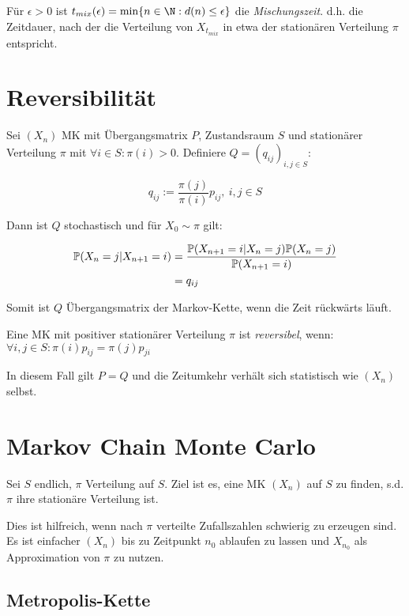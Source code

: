 Für $\epsilon > 0$ ist $t_{mix}(\epsilon) = \min\{ n \in \N : d(n) \leq \epsilon \}$ die \emph{Mischungszeit}. d.h. die Zeitdauer, nach der die Verteilung von $X_{t_{mix}}$ in etwa der stationären Verteilung $\pi$ entspricht.

\section*{Reversibilität}

Sei $(X_n)$ MK mit Übergangsmatrix $P$, Zustandsraum $S$ und stationärer Verteilung $\pi$ mit $\forall i \in S : \pi(i) > 0$. Definiere $Q = (q_{ij})_{i,j \in S}$:

\vspace*{-2mm}
\[ q_{ij} := \frac{\pi(j)}{\pi(i)} p_{ij}, \ i,j \in S \]

Dann ist $Q$ stochastisch und für $X_0 \sim \pi$ gilt:

\vspace*{-4mm}
\begin{align*}
\P(X_n = j | X_{n+1} = i) &= \frac{\P(X_{n+1} = i | X_n = j) \P(X_n = j)}{\P(X_{n+1} = i)} \\
&= q_{ij}
\end{align*}

Somit ist $Q$ Übergangsmatrix der Markov-Kette, wenn die Zeit rückwärts läuft.

\vspace*{1mm}

Eine MK mit positiver stationärer Verteilung $\pi$ ist \emph{reversibel}, wenn: $\forall i, j \in S : \pi(i)p_{ij} = \pi(j)p_{ji}$

\vspace*{1mm}

In diesem Fall gilt $P=Q$ und die Zeitumkehr verhält sich statistisch wie $(X_n)$ selbst.

\section*{Markov Chain Monte Carlo}

Sei $S$ endlich, $\pi$ Verteilung auf $S$. Ziel ist es, eine MK $(X_n)$ auf $S$ zu finden, s.d. $\pi$ ihre stationäre Verteilung ist.

Dies ist hilfreich, wenn nach $\pi$ verteilte Zufallszahlen schwierig zu erzeugen sind. Es ist einfacher $(X_n)$ bis zu Zeitpunkt $n_0$ ablaufen zu lassen und $X_{n_0}$ als Approximation von $\pi$ zu nutzen.

\subsection*{Metropolis-Kette}


